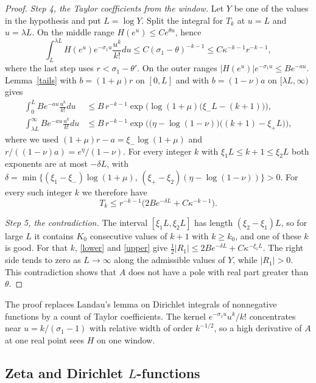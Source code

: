 \documentclass[11pt,letterpaper]{article}
\numberwithin{equation}{section}
\begin{document}
\begin{proof}
\emph{Step 4, the Taylor coefficients from the window.} Let $Y$ be one of the values in the hypothesis and put $L=\log Y$. Split the integral for $T_k$ at $u=L$ and $u=\lambda L$. On the middle range $H(e^u)\le Ce^{\theta u}$, hence
\[
\int_L^{\lambda L}H(e^u)e^{-\sigma_1u}\frac{u^k}{k!}du\le C(\sigma_1-\theta)^{-k-1}\le C\kappa^{-k-1}r^{-k-1},
\]
where the last step uses $r<\sigma_1-\theta'$. On the outer ranges $|H(e^u)|e^{-\sigma_1u}\le Be^{-au}$. Lemma~\ref{tails} with $b=(1+\mu)r$ on $[0,L]$ and with $b=(1-\nu)a$ on $[\lambda L,\infty)$ gives
\begin{align*}
\int_0^L Be^{-au}\frac{u^k}{k!}du&\le B\,r^{-k-1}\exp\!\Big(\log(1+\mu)\big(\xi_-L-(k+1)\big)\Big),\\
\int_{\lambda L}^\infty Be^{-au}\frac{u^k}{k!}du&\le B\,r^{-k-1}\exp\!\Big(\big(\eta-\log(1-\nu)\big)\big((k+1)-\xi_+L\big)\Big),
\end{align*}
where we used $(1+\mu)r-a=\xi_-\log(1+\mu)$ and $r/((1-\nu)a)=e^{\eta}/(1-\nu)$. For every integer $k$ with $\xi_1L\le k+1\le\xi_2L$ both exponents are at most $-\delta L$, with $\delta=\min\{(\xi_1-\xi_-)\log(1+\mu),\,(\xi_+-\xi_2)(\eta-\log(1-\nu))\}>0$. For every such integer $k$ we therefore have
\begin{equation}\label{upper}
T_k\le r^{-k-1}\big(2Be^{-\delta L}+C\kappa^{-k-1}\big).
\end{equation}

\emph{Step 5, the contradiction.} The interval $[\xi_1L,\xi_2L]$ has length $(\xi_2-\xi_1)L$, so for large $L$ it contains $K_0$ consecutive values of $k+1$ with $k\ge k_0$, and one of these $k$ is good. For that $k$, \eqref{lower} and \eqref{upper} give $\tfrac12|R_1|\le2Be^{-\delta L}+C\kappa^{-\xi_1L}$. The right side tends to zero as $L\to\infty$ along the admissible values of $Y$, while $|R_1|>0$. This contradiction shows that $A$ does not have a pole with real part greater than $\theta$.
\end{proof}

The proof replaces Landau's lemma \cite{landau} on Dirichlet integrals of nonnegative functions by a count of Taylor coefficients. The kernel $e^{-\sigma_1u}u^k/k!$ concentrates near $u=k/(\sigma_1-1)$ with relative width of order $k^{-1/2}$, so a high derivative of $A$ at one real point sees $H$ on one window.

\subsection{Zeta and Dirichlet \texorpdfstring{$L$}{L}-functions}
\end{document}
